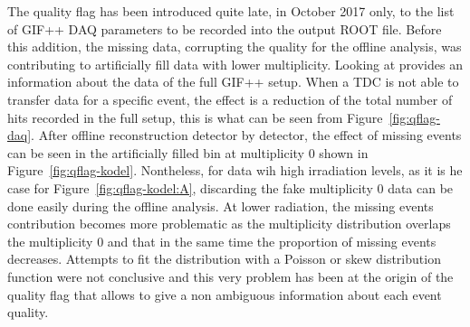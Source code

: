 	The quality flag has been introduced quite late, in October 2017 only, to the list of GIF++ DAQ parameters to be recorded into the output ROOT file. Before this addition, the missing data, corrupting the quality for the offline analysis, was contributing to artificially fill data with lower multiplicity. Looking at  provides an information about the data of the full GIF++ setup. When a TDC is not able to transfer data for a specific event, the effect is a reduction of the total number of hits recorded in the full setup, this is what can be seen from Figure~\ref{fig:qflag-daq}. After offline reconstruction detector by detector, the effect of missing events can be seen in the artificially filled bin at multiplicity 0 shown in Figure~\ref{fig:qflag-kodel}. Nontheless, for data wih high irradiation levels, as it is he case for Figure~\ref{fig:qflag-kodel:A}, discarding the fake multiplicity 0 data can be done easily during the offline analysis. At lower radiation, the missing events contribution becomes more problematic as the multiplicity distribution overlaps the multiplicity 0 and that in the same time the proportion of missing events decreases. Attempts to fit the distribution with a Poisson or skew distribution function were not conclusive and this very problem has been at the origin of the quality flag that allows to give a non ambiguous information about each event quality.\\
	
